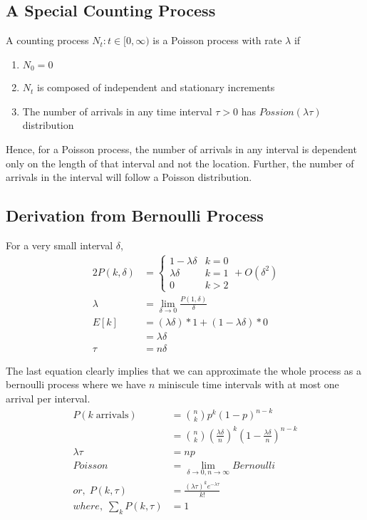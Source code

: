 \documentclass[../../probability-notes.tex]{subfiles}
\begin{document}
    \subsection{A Special Counting Process}
    A counting process $N_{t}:t \in [0,\infty)$ is a Poisson process with rate $\lambda$ if
    \begin{enumerate}
        \item $N_{0} = 0$
        \item $N_{t}$ is composed of independent and stationary increments
        \item The number of arrivals in any time interval $\tau > 0$ has $Possion(\lambda \tau)$ distribution
    \end{enumerate}
    Hence, for a Poisson process, the number of arrivals in any interval is dependent only on the length of that interval and not the location. Further, the number of arrivals in the interval will follow a Poisson distribution.

    \subsection{Derivation from Bernoulli Process}
    For a very small interval $\delta$,
    \begin{alignat*}{2}
        P(k, \delta) &= \begin{cases} 1-\lambda \delta &\mbox{$k = 0$}\\
                                     \lambda \delta &\mbox{$k = 1$}\\
                                     0 &\mbox{$k > 2$} \end{cases} + O(\delta^{2})\\
        \lambda &= \lim_{\delta \to 0}\frac{P(1,\delta)}{\delta} \tag*{arrival rate per unit time}\\
        E[k] &= (\lambda \delta) * 1 + (1-\lambda \delta) * 0\\
            &= \lambda \delta \\
        \tau &= n \delta
    \end{alignat*}

    The last equation clearly implies that we can approximate the whole process as a bernoulli process where we have $n$ miniscule time intervals with at most one arrival per interval.
    \begin{align*}
        P(k\; \text{arrivals}) &= \binom{n}{k} p^{k} (1-p)^{n-k} \\
            &= \binom{n}{k} (\frac{\lambda \delta}{n})^{k} (1 - \frac{\lambda \delta}{n})^{n-k}\\
        \lambda \tau &= np \tag*{or, arrival rate * time = E[arrivals]}\\
        Poisson &= \lim_{\delta \to 0, n \to \infty} Bernoulli\\
        or,\; P(k, \tau) &= \frac{(\lambda \tau)^{k} e^{-\lambda \tau}}{k!} \tag*{$k = 0,1, \cdots$, for a given $\tau$}\\
        where,\; \sum_{k} P(k, \tau) &= 1 \tag*{for a given $\tau$}
    \end{align*}
\end{document}
